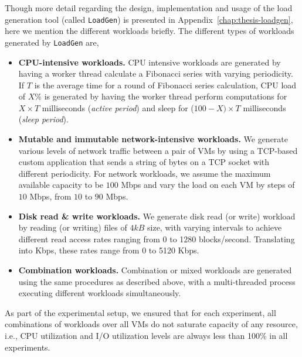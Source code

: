 Though more detail regarding the design, implementation
and usage of the load generation tool (called \texttt{LoadGen})
is presented in Appendix~\ref{chap:thesis-loadgen}, here 
we mention the different workloads briefly.
The different types of workloads generated by \texttt{LoadGen} are,
% 
\begin{itemize}
\item \textbf{CPU-intensive workloads.}
CPU intensive workloads are generated by having a worker
thread calculate a Fibonacci series with varying periodicity.
If $T$ is the average time for a round of Fibonacci series calculation,
CPU load of $X\%$ is generated by having the worker thread perform
computations for $X \times T$ milliseconds (\emph{active period}) and
sleep for ($100-X) \times T$ milliseconds (\emph{sleep period}).
\item \textbf{Mutable and immutable network-intensive workloads.} 
We generate various levels of network traffic between a pair of VMs by using
a TCP-based custom application that sends a string of bytes on a
TCP socket with different periodicity.
For network workloads, we assume the maximum available capacity 
to be $100$ Mbps and vary the load on each VM by steps 
of $10$ Mbps, from $10$ to $90$ Mbps.
\item \textbf{Disk read \& write workloads.}
We generate disk read (or write) workload by reading (or writing) files  
of $4 kB$ size, with varying intervals to achieve different read access
rates ranging from 0 to 1280 blocks/second. Translating into Kbps, these
rates range from 0 to 5120 Kbps.
\item \textbf{Combination workloads.}
Combination or mixed workloads are generated using 
the same procedures as described above, with a 
multi-threaded process executing different workloads 
simultaneously.
\end{itemize}
As part of the experimental setup, we ensured that for each 
experiment, all combinations of workloads over all VMs do not 
saturate capacity of any resource, i.e., CPU utilization and 
I/O utilization levels are always less than 100\% in all experiments.

